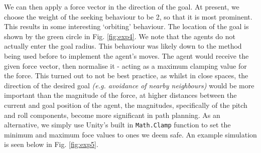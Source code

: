 \documentclass[12pt]{article}
\begin{document}
We can then apply a force vector in the direction of the goal. At present, we choose the weight of the seeking behaviour to be 2, so that it is most prominent. This results in some interesting `orbiting' behaviour. The location of the goal is shown by the green circle in Fig. \ref{fig:exp4}. We note that the agents do not actually enter the goal radius. This behaviour was likely down to the method being used before to implement the agent's moves. The agent would receive the given force vector, then normalise it - acting as a maximum clamping value for the force. This turned out to not be best practice, as whilst in close spaces, the direction of the desired goal \emph{(e.g. avoidance of nearby neighbours)} would be more important than the magnitude of the force, at higher distances between the current and goal position of the agent, the magnitudes, specifically of the pitch and roll components, become more significant in path planning. As an alternative, we simply use Unity's built in \verb|Math.Clamp| function to set the minimum and maximum foce values to ones we deem safe. An example simulation is seen below in Fig. \ref{fig:exp5}.
\end{document}
